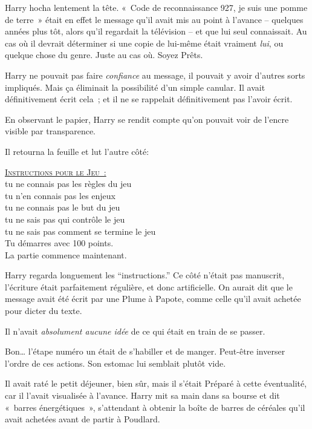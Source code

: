 Harry hocha lentement la tête. «~Code de reconnaissance 927, je suis une pomme de terre~» était en effet le message qu'il avait mis au point à l'avance -- quelques années plus tôt, alors qu'il regardait la télévision -- et que lui seul connaissait.
Au cas où il devrait déterminer si une copie de lui-même était vraiment \emph{lui}, ou quelque chose du genre.
Juste au cas où. Soyez Prêts.

Harry ne pouvait pas faire \emph{confiance} au message, il pouvait y avoir d'autres sorts impliqués.
Mais ça éliminait la possibilité d'un simple canular.
Il avait définitivement écrit cela~; et il ne se rappelait définitivement pas l'avoir écrit.

En observant le papier, Harry se rendit compte qu'on pouvait voir de l'encre visible par transparence.

Il retourna la feuille et lut l'autre côté:
\medskip
\begin{theGame}
\textsc{\underline{Instructions pour le Jeu~:}}
\\

tu ne connais pas les règles du jeu\\
tu n'en connais pas les enjeux\\
tu ne connais pas le but du jeu\\
tu ne sais pas qui contrôle le jeu\\
tu ne sais pas comment se termine le jeu
\\

Tu démarres avec 100 points.\\
La partie commence maintenant.\\
\end{theGame}

Harry regarda longuement les “instructions.”
Ce côté n'était pas manuscrit, l'écriture était parfaitement régulière, et donc artificielle.
On aurait dit que le message avait été écrit par une Plume à Papote, comme celle qu'il avait achetée pour dicter du texte.

Il n'avait \emph{absolument aucune idée} de ce qui était en train de se passer.

Bon… l'étape numéro un était de s'habiller et de manger.
Peut-être inverser l'ordre de ces actions.
Son estomac lui semblait plutôt vide.

Il avait raté le petit déjeuner, bien sûr, mais il s'était Préparé à cette éventualité, car il l'avait visualisée à l'avance.
Harry mit sa main dans sa bourse et dit «~barres énergétiques~», s'attendant à obtenir la boîte de barres de céréales qu'il avait achetées avant de partir à Poudlard.

